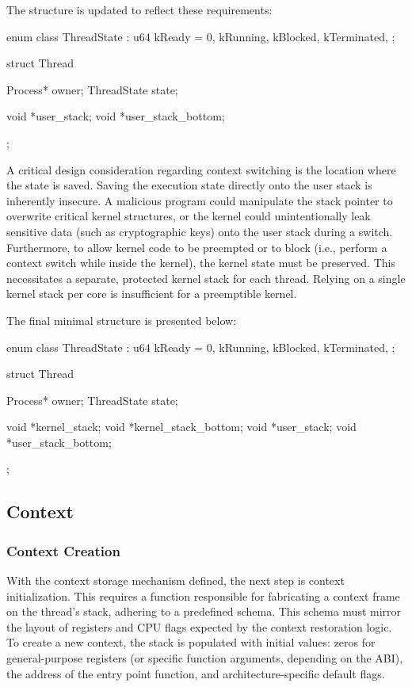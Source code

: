 \documentclass[a4paper,10pt,twoside]{report}
\theoremstyle{definition}
\begin{document}
\noindent The structure is updated to reflect these requirements:
\begin{cppcode}[caption={Thread Structure Second Iteration}, label={lst:os-tutorial-thread-v1}]
enum class ThreadState : u64 {
    kReady = 0,
    kRunning,
    kBlocked,
    kTerminated,
};

struct Thread {
    Process* owner;
    ThreadState state;

    void *user_stack;
    void *user_stack_bottom;
};
\end{cppcode}

A critical design consideration regarding context switching is the location where the state is saved. Saving the execution state directly onto the user stack is inherently insecure. A malicious program could manipulate the stack pointer to overwrite critical kernel structures, or the kernel could unintentionally leak sensitive data (such as cryptographic keys) onto the user stack during a switch. Furthermore, to allow kernel code to be preempted or to block (i.e., perform a context switch while inside the kernel), the kernel state must be preserved. This necessitates a separate, protected kernel stack for each thread. Relying on a single kernel stack per core is insufficient for a preemptible kernel.

\noindent The final minimal structure is presented below:

\clearpage

\begin{cppcode}[caption={Thread Structure Third Iteration}, label={lst:os-tutorial-thread-v2}]
enum class ThreadState : u64 {
    kReady = 0,
    kRunning,
    kBlocked,
    kTerminated,
};

struct Thread {
    Process* owner;
    ThreadState state;

    void *kernel_stack;
    void *kernel_stack_bottom;
    void *user_stack;
    void *user_stack_bottom;
};
\end{cppcode}

\subsection{Context}

\subsubsection{Context Creation}
\label{subsec:context-init}

With the context storage mechanism defined, the next step is context initialization. This requires a function responsible for fabricating a context frame on the thread's stack, adhering to a predefined schema. This schema must mirror the layout of registers and CPU flags expected by the context restoration logic. To create a new context, the stack is populated with initial values: zeros for general-purpose registers (or specific function arguments, depending on the ABI), the address of the entry point function, and architecture-specific default flags.
\end{document}
